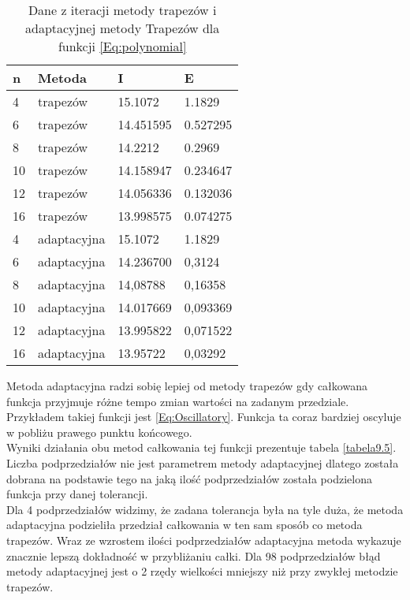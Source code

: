 \documentclass[12pt,twoside]{article}
\begin{document}
\begin{table}[H]
\centering 
\caption{Dane z iteracji metody trapezów i adaptacyjnej metody Trapezów dla funkcji \eqref{Eq:polynomial}}
\label{tabela9.4}
\begin{tabular}{llll}
\toprule
{n} & Metoda &  I &  E \\
\midrule
4  &     trapezów & 15.1072  &   1.1829 \\
6  &     trapezów & 14.451595 &   0.527295 \\
8  &     trapezów & 14.2212   &   0.2969  \\
10  &    trapezów & 14.158947  &   0.234647  \\
12  &    trapezów & 14.056336 &    0.132036  \\
16 &     trapezów & 13.998575  &   0.074275  \\
\midrule
4  &     adaptacyjna & 15.1072 &   1.1829 \\
6  &     adaptacyjna & 14.236700 &   0,3124 \\
8  &     adaptacyjna & 14,08788  &   0,16358  \\
10  &    adaptacyjna & 14.017669 &  0,093369  \\
12  &    adaptacyjna & 13.995822 &   0,071522  \\
16 &     adaptacyjna & 13.95722 &    0,03292  \\

\bottomrule
\end{tabular}
\end{table}

Metoda adaptacyjna radzi sobię lepiej od metody trapezów gdy całkowana funkcja przyjmuje różne tempo zmian wartości na zadanym przedziale. Przykładem takiej funkcji jest \eqref{Eq:Oscillatory}. Funkcja ta coraz bardziej oscyluje w pobliżu prawego punktu końcowego.\\
Wyniki działania obu metod całkowania tej funkcji prezentuje tabela \ref{tabela9.5}.\\
Liczba podprzedziałów nie jest parametrem metody adaptacyjnej dlatego została dobrana na podstawie tego na jaką ilość podprzedziałów została podzielona funkcja przy danej tolerancji.\\
Dla 4 podprzedziałów widzimy, że zadana tolerancja była na tyle duża, że metoda adaptacyjna podzieliła przedział całkowania w ten sam sposób co metoda trapezów.
Wraz ze wzrostem ilości podprzedziałów adaptacyjna metoda wykazuje znacznie lepszą dokładność w przybliżaniu całki. Dla 98 podprzedziałów błąd metody adaptacyjnej jest o 2 rzędy wielkości mniejszy niż przy zwykłej metodzie trapezów.
\end{document}
